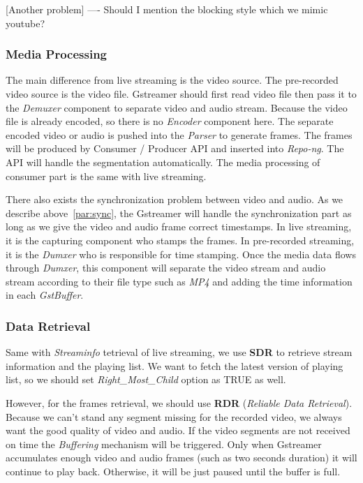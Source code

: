 [Another problem] ---- Should I mention the blocking style which we mimic youtube?

\subsubsection{Media Processing}

The main difference from live streaming is the video source. The pre-recorded video source is the video file. Gstreamer should first read video file then pass it to the \textit{Demuxer} component to separate video and audio stream. Because the video file is already encoded, so there is no \textit{Encoder} component here. The separate encoded video or audio is pushed into the \textit{Parser} to generate frames. The frames will be produced by Consumer / Producer API and inserted into \textit{Repo-ng}. The API will handle the segmentation automatically. The media processing of consumer part is the same with live streaming.

There also exists the synchronization problem between video and audio. As we describe above~\ref{par:sync}, the Gstreamer will handle the synchronization part as long as we give the video and audio frame correct timestamps. In live streaming, it is the capturing component who stamps the frames. In pre-recorded streaming, it is the \textit{Dumxer} who is responsible for time stamping. Once the media data flows through \textit{Dumxer}, this component will separate the video stream and audio stream according to their file type such as \textit{MP4} and adding the time information in each \textit{GstBuffer}.

\subsubsection{Data Retrieval}
Same with \textit{Streaminfo} tetrieval of live streaming, we use \textbf{SDR} to retrieve stream information and the playing list. We want to fetch the latest version of playing list, so we should set \textit{Right\_Most\_Child} option as TRUE as well.

However, for the frames retrieval, we should use \textbf{RDR} (\textit{Reliable Data Retrieval}). Because we can't stand any segment missing for the recorded video, we always want the good quality of video and audio. If the video segments are not received on time the \textit{Buffering} mechanism will be triggered. Only when Gstreamer accumulates enough video and audio frames (such as two seconds duration) it will continue to play back. Otherwise, it will be just paused until the buffer is full.

